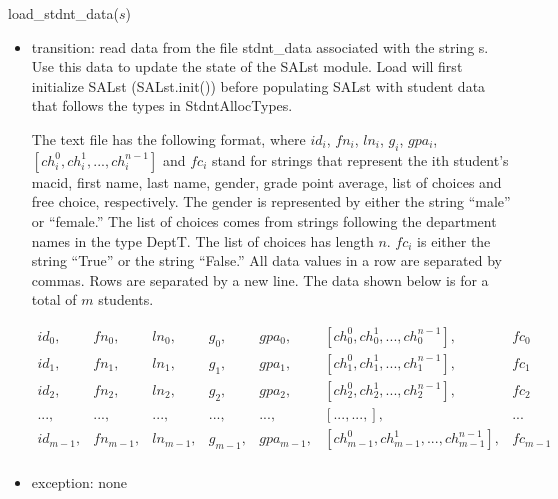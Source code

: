 \documentclass[12pt]{article}
\begin{document}
\noindent load\_stdnt\_data($s$)
\begin{itemize}
\item transition: read data from the file stdnt\_data associated with the string s.
  Use this data to update the state of the SALst module.  Load will first
  initialize SALst (SALst.init()) before populating SALst with student data that
  follows the types in StdntAllocTypes.

  The text file has the following format, where $id_i$, $fn_i$, $ln_i$, $g_i$,
  $gpa_i$, $[ch_i^0, ch_i^1, ..., ch_i^{n-1}]$ and $fc_i$ stand for strings that
  represent the ith student's macid, first name, last name, gender, grade point
  average, list of choices and free choice, respectively.  The gender is
  represented by either the string ``male'' or ``female.''  The list of choices
  comes from strings following the department names in the type DeptT.  The list
  of choices has length $n$.  $fc_i$ is either the string ``True'' or the string
  ``False.''  All data values in a row are separated by commas.  Rows are
  separated by a new line.  The data shown below is for a total of $m$ students.

  \begin{equation}
    \begin{array}{ccccccc}
      id_0, & fn_0, & ln_0, & g_0, & gpa_0, & [ch_0^0, ch_0^1, ..., ch_0^{n-1}], & fc_0 \\
      id_1, & fn_1, & ln_1, & g_1, & gpa_1, & [ch_1^0, ch_1^1, ..., ch_1^{n-1}], & fc_1\\
      id_2, & fn_2, & ln_2, & g_2, & gpa_2, & [ch_2^0, ch_2^1, ..., ch_2^{n-1}], & fc_2
      \\
      ..., & ..., & ..., & ..., & ..., & [..., ..., ], & ...
      \\
      id_{m-1}, & fn_{m-1}, & ln_{m-1}, & g_{m-1}, & gpa_{m-1}, & [ch_{m-1}^0, ch_{m-1}^1, ..., ch_{m-1}^{n-1}], & fc_{m-1} \\
    \end{array}
  \end{equation}

\item exception: none
\end{itemize}
\end{document}
